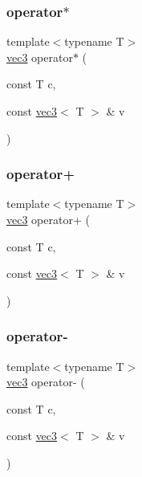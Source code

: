 \subsubsection{\texorpdfstring{operator$\ast$}{operator*}}
{\footnotesize\ttfamily template$<$typename T$>$ \\
\mbox{\hyperlink{structvec3}{vec3}} operator$\ast$ (\begin{DoxyParamCaption}\item[{const T}]{c,  }\item[{const \mbox{\hyperlink{structvec3}{vec3}}$<$ T $>$ \&}]{v }\end{DoxyParamCaption})\hspace{0.3cm}{\ttfamily [friend]}}

\mbox{\label{structvec3_a04165a00cae4ce5d2f5e142cc177a720}} 
\subsubsection{\texorpdfstring{operator+}{operator+}}
{\footnotesize\ttfamily template$<$typename T$>$ \\
\mbox{\hyperlink{structvec3}{vec3}} operator+ (\begin{DoxyParamCaption}\item[{const T}]{c,  }\item[{const \mbox{\hyperlink{structvec3}{vec3}}$<$ T $>$ \&}]{v }\end{DoxyParamCaption})\hspace{0.3cm}{\ttfamily [friend]}}

\mbox{\label{structvec3_a6252e85a538cca25b99107166be778b1}} 
\subsubsection{\texorpdfstring{operator-\/}{operator-}}
{\footnotesize\ttfamily template$<$typename T$>$ \\
\mbox{\hyperlink{structvec3}{vec3}} operator-\/ (\begin{DoxyParamCaption}\item[{const T}]{c,  }\item[{const \mbox{\hyperlink{structvec3}{vec3}}$<$ T $>$ \&}]{v }\end{DoxyParamCaption})\hspace{0.3cm}{\ttfamily [friend]}}

